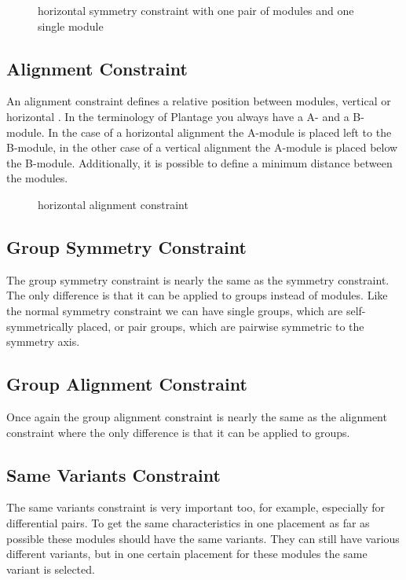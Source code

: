 \begin{figure}
	\centering
	
	\caption{horizontal symmetry constraint with one pair of modules and one single module}
	\label{fig:constraint_symmetry}
\end{figure}

\subsection{Alignment Constraint}
An alignment constraint defines a relative position between modules, vertical or horizontal . In the terminology of Plantage you always have a A- and a B-module. In the case of a horizontal alignment the A-module is placed left to the B-module, in the other case of a vertical alignment the A-module is placed below the B-module. Additionally, it is possible to define a minimum distance between the modules.

\begin{figure}
	\centering
	
	\caption{horizontal alignment constraint}
	\label{fig:constraint_alignment}
\end{figure}

\subsection{Group Symmetry Constraint}
The group symmetry constraint is nearly the same as the symmetry constraint. The only difference is that it can be applied to groups instead of modules. Like the normal symmetry constraint we can have single groups, which are self-symmetrically placed, or pair groups, which are pairwise symmetric to the symmetry axis.

\subsection{Group Alignment Constraint}
Once again the group alignment constraint is nearly the same as the alignment constraint where the only difference is that it can be applied to groups.

\subsection{Same Variants Constraint}
The same variants constraint is very important too, for example, especially for differential pairs. To get the same characteristics in one placement as far as possible these modules should have the same variants. They can still have various different variants, but in one certain placement for these modules the same variant is selected.

